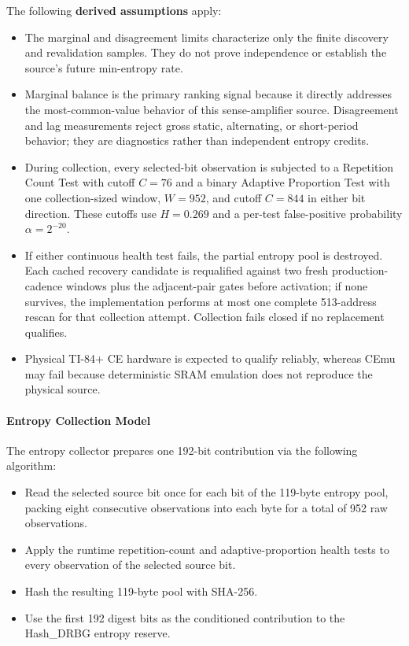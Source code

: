 \documentclass[titlepage]{report}
\begin{document}
		The following \textbf{derived assumptions} apply:
		\begin{itemize}
		\item The marginal and disagreement limits characterize only the finite discovery and revalidation samples. They do not prove independence or establish the source's future min-entropy rate.
		\item Marginal balance is the primary ranking signal because it directly addresses the most-common-value behavior of this sense-amplifier source. Disagreement and lag measurements reject gross static, alternating, or short-period behavior; they are diagnostics rather than independent entropy credits.
		\item During collection, every selected-bit observation is subjected to a Repetition Count Test with cutoff $C=76$ and a binary Adaptive Proportion Test with one collection-sized window, $W=952$, and cutoff $C=844$ in either bit direction. These cutoffs use $H=0.269$ and a per-test false-positive probability $\alpha=2^{-20}$.
		\item If either continuous health test fails, the partial entropy pool is destroyed. Each cached recovery candidate is requalified against two fresh production-cadence windows plus the adjacent-pair gates before activation; if none survives, the implementation performs at most one complete 513-address rescan for that collection attempt. Collection fails closed if no replacement qualifies.
		\item Physical TI-84+ CE hardware is expected to qualify reliably, whereas CEmu may fail because deterministic SRAM emulation does not reproduce the physical source.
		\end{itemize}
	
	\paragraph{Entropy Collection Model}
	The entropy collector prepares one 192-bit contribution via the following algorithm:
	\begin{itemize}
		\item Read the selected source bit once for each bit of the 119-byte entropy pool, packing eight consecutive observations into each byte for a total of 952 raw observations.
		\item Apply the runtime repetition-count and adaptive-proportion health tests to every observation of the selected source bit.
		\item Hash the resulting 119-byte pool with SHA-256.
		\item Use the first 192 digest bits as the conditioned contribution to the Hash\_DRBG entropy reserve.
	\end{itemize}
	
\end{document}
